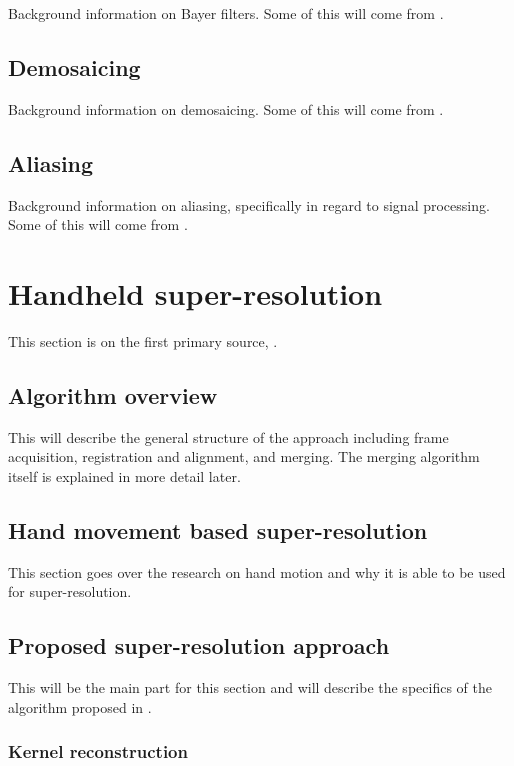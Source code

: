 \documentclass{sig-alternate}
\begin{document}
Background information on Bayer filters. Some of this will come from \cite{wiki:BayerFilter}.

\subsection{Demosaicing}

Background information on demosaicing. Some of this will come from \cite{wiki:Demosaicing}.

\subsection{Aliasing}

Background information on aliasing, specifically in regard to signal processing. Some of this will come from \cite{wiki:Aliasing}.

\section{Handheld super-resolution}

This section is on the first primary source, \cite{Wronski2019}.

\subsection{Algorithm overview}

This will describe the general structure of the approach including frame acquisition, registration and alignment, and merging. The merging algorithm itself is explained in more detail later.

\subsection{Hand movement based super-resolution}

This section goes over the research on hand motion and why it is able to be used for super-resolution.

\subsection{Proposed super-resolution approach}

This will be the main part for this section and will describe the specifics of the algorithm proposed in \cite{Wronski2019}. 

\subsubsection{Kernel reconstruction}
\end{document}
